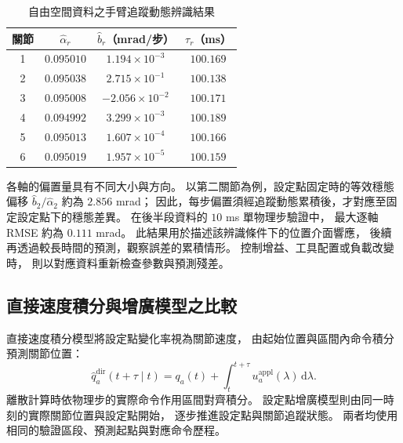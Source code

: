 \begin{table}[htbp]
    \centering
    \caption{自由空間資料之手臂追蹤動態辨識結果}
    \label{tab:ch4_arm_identification_parameters}
    \begingroup
    \small
    \renewcommand{\arraystretch}{1.2}
    \begin{tabular}{c c c c}
        \hline
        關節 & $\hat\alpha_r$ & $\hat b_r$（mrad/步） & $\tau_r$（ms） \\
        \hline
        1 & $0.095010$ & $1.194\times10^{-3}$  & $100.169$ \\
        2 & $0.095038$ & $2.715\times10^{-1}$  & $100.138$ \\
        3 & $0.095008$ & $-2.056\times10^{-2}$ & $100.171$ \\
        4 & $0.094992$ & $3.299\times10^{-3}$  & $100.189$ \\
        5 & $0.095013$ & $1.607\times10^{-4}$  & $100.166$ \\
        6 & $0.095019$ & $1.957\times10^{-5}$  & $100.159$ \\
        \hline
    \end{tabular}
    \endgroup
\end{table}

各軸的偏置量具有不同大小與方向。
以第二關節為例，設定點固定時的等效穩態偏移
$\hat b_2/\hat\alpha_2$ 約為 $2.856$ mrad；
因此，每步偏置須經追蹤動態累積後，才對應至固定設定點下的穩態差異。
在後半段資料的 $10$ ms 單物理步驗證中，
最大逐軸 RMSE 約為 $0.111$ mrad。
此結果用於描述該辨識條件下的位置介面響應，
後續再透過較長時間的預測，觀察誤差的累積情形。
控制增益、工具配置或負載改變時，
則以對應資料重新檢查參數與預測殘差。

\subsection{直接速度積分與增廣模型之比較}
\label{subsec:direct_augmented_model_comparison}

直接速度積分模型將設定點變化率視為關節速度，
由起始位置與區間內命令積分預測關節位置：
\begin{equation}
    \hat q_a^{\mathrm{dir}}(t+\tau\mid t)
    =q_a(t)+\int_t^{t+\tau}u_a^{\mathrm{appl}}(\lambda)\,\mathrm d\lambda.
    \label{eq:ch4_direct_velocity_prediction}
\end{equation}
離散計算時依物理步的實際命令作用區間對齊積分。
設定點增廣模型則由同一時刻的實際關節位置與設定點開始，
逐步推進設定點與關節追蹤狀態。
兩者均使用相同的驗證區段、預測起點與對應命令歷程。

